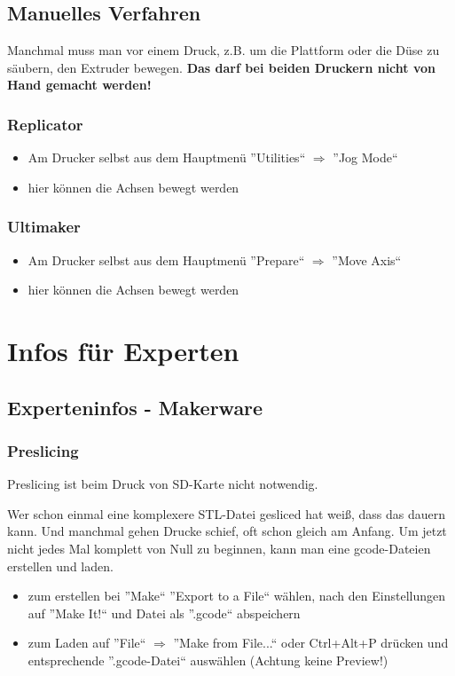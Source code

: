 \documentclass{\basedir/fablab-document}
\begin{document}
\subsection{Manuelles Verfahren}\label{manuelles-verfahren}
Manchmal muss man vor einem Druck, z.B. um die Plattform oder die Düse zu säubern, den Extruder bewegen.
\textbf{Das darf bei beiden Druckern nicht von Hand gemacht werden!}

\subsubsection{Replicator}
\begin{itemize}
 \item Am Drucker selbst aus dem Hauptmenü ''Utilities`` $\Rightarrow$ ''Jog Mode``
 \item hier können die Achsen bewegt werden
\end{itemize}

\subsubsection{Ultimaker}
\begin{itemize}
 \item Am Drucker selbst aus dem Hauptmenü ''Prepare`` $\Rightarrow$ ''Move Axis``
 \item hier können die Achsen bewegt werden
\end{itemize}

\section{Infos für Experten}

\subsection{Experteninfos - Makerware} \label{expinfos}
\subsubsection{Preslicing}
Preslicing ist beim Druck von SD-Karte nicht notwendig.

Wer schon einmal eine komplexere STL-Datei gesliced hat weiß, dass das dauern kann. Und manchmal gehen Drucke schief,
oft schon gleich am Anfang. Um jetzt nicht jedes Mal komplett von Null zu beginnen, kann man eine gcode-Dateien erstellen
und laden.
\begin{itemize}
\item zum erstellen bei ''Make`` ''Export to a File`` wählen, nach den Einstellungen auf ''Make It!`` und Datei als ''.gcode`` abspeichern
\item zum Laden auf ''File`` $\Rightarrow$ ''Make from File...`` oder Ctrl+Alt+P drücken und entsprechende ''.gcode-Datei`` auswählen (Achtung keine Preview!)
\end{itemize}
\end{document}
